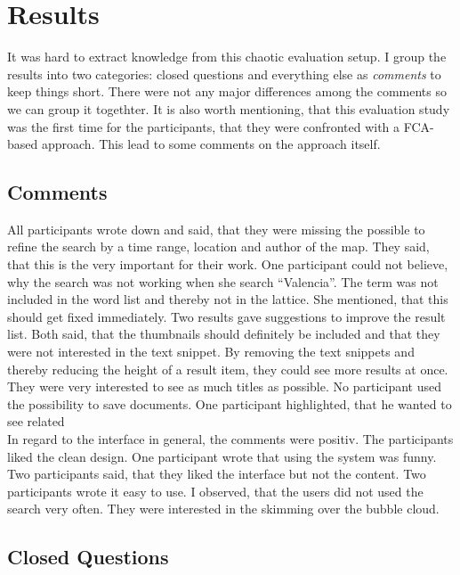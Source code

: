 \documentclass[11pt]{report}
\begin{document}
\section{Results}

It was hard to extract knowledge from this chaotic evaluation setup. I group the results into two categories: closed questions and everything else as \textit{comments} to keep things short. There were not any major differences among the comments so we can group it togethter. It is also worth mentioning, that this evaluation study was the first time for the participants, that they were confronted with a FCA-based approach. This lead to some comments on the approach itself.

\subsection{Comments}
All participants wrote down and said, that they were missing the possible to refine the search by a time range, location and author of the map. They said, that this is the very important for their work. One participant could not believe, why the search was not working when she search ``Valencia''. The term was not included in the word list and thereby not in the lattice. She mentioned, that this should get fixed immediately. Two results gave suggestions to improve the result list. Both said, that the thumbnails should definitely be included and that they were not interested in the text snippet. By removing the text snippets and thereby reducing the height of a result item, they could see more results at once. They were very interested to see as much titles as possible. No participant used the possibility to save documents. One participant highlighted, that he wanted to see related \\

In regard to the interface in general, the comments were positiv. The participants liked the clean design. One participant wrote that using the system was funny. Two participants said, that they liked the interface but not the content. Two participants wrote it easy to use. I observed, that the users did not used the search very often. They were interested in the skimming over the bubble cloud.

\subsection{Closed Questions}
\end{document}
